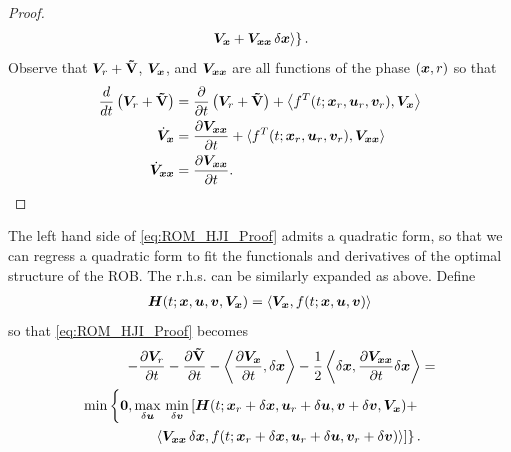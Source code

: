 \begin{proof}
\begin{align}
\begin{split}
			\left. \left. \valuefunc_{\state} +  \valuefunc_{\state\state}\, \delta \state \right\rangle \right\}. 
		\end{split}
		\label{eq:ROM_HJI_Proof}
	\end{align}
	Observe that $\bm{V}_r+ \mathbf{\tilde{V}}$, $\bm{V}_{\bm{x}}$, and $\bm{V}_{\bm{x}\bm{x}}$ are all functions of the phase $\left(\bm{x}, r\right)$ so that 
	\begin{subequations}
		\begin{align}
			\frac{d}{dt}\left(\valuefunc_r + \costdiff\right) &= \dfrac{\partial}{\partial t}\left(\valuefunc_r + \costdiff\right) + \left\langle f^T(t; \state_r, \control_r, \disturb_r), \valuefunc_{\state} \right \rangle \\
			\dot{\valuefunc}_{\state} &= \dfrac{\partial \valuefunc_{\state\state}}{\partial t} + \langle f^T(t; \state_r, \control_r, \disturb_r),  \valuefunc_{\state\state} \rangle \\
			\dot{\valuefunc}_{\state\state} &= \dfrac{\partial \valuefunc_{\state\state}}{\partial t}. %
		\end{align}
		\label{eq:reduced_canonical}
	\end{subequations}
\end{proof} 
%
The left hand side of \eqref{eq:ROM_HJI_Proof} admits a quadratic form, so that we can regress a quadratic form to fit the functionals and derivatives of the optimal structure of the ROB. The r.h.s. can be similarly expanded as above.   Define 
%
\begin{align}
	\bm{H}(t; \bm{x}, \bm{u}, \bm{v}, \bm{V}_{\bm{x}}) = \langle \bm{V}_{\bm{x}}, f(t; \bm{x}, \bm{u}, \bm{v}) \rangle 
\end{align}
%
so that \eqref{eq:ROM_HJI_Proof} becomes
%
\begin{align}
	\begin{split} 
		-\frac{\partial \valuefunc_r}{\partial t} -\frac{\partial \costdiff}{\partial t} - \left\langle \dfrac{\partial\valuefunc_{\state}}{\partial t}, \delta\state \right \rangle -  \dfrac{1}{2} \left\langle \delta \state, \dfrac{\partial \valuefunc_{\state\state} }{\partial t}\delta\state \right \rangle &=  \\
		\min \left\{\bm{0},  
		\max_{\delta \control} \, \min_{\delta \disturb} \left[\hamfunc(t; \state_r + \delta \state, \control_r + \delta \control, \disturb + \delta \disturb, \valuefunc_{\state}) + \right. \right. \\
		\left. \left.  \left\langle \valuefunc_{\state\state}\, \delta \state, f(t; \state_r + \delta \state, \control_r + \delta \control,  \disturb_r + \delta \disturb)  \right\rangle\right] \right\}. 
	\end{split}
\label{eq:rob_expand}
\end{align}

